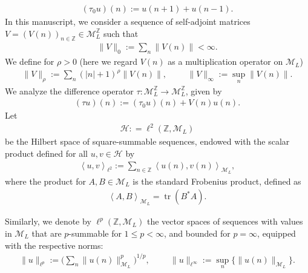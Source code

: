 \documentclass[12pt,oneside,onecolumn,open]{article}
\begin{document}
\begin{align}\label{Edso1}
(\tau_{0}u)(n ) := u(n+1) + u(n-1).      
\end{align}
In this manuscript, we consider a sequence of self-adjoint matrices $V=(V(n))_{n\in \mathbb{Z}}\in \mathcal{M}_{L}^{\mathbb{Z}} $ such that 
\begin{align} \label{firstfinitemoment}
  \|  V \|_{0}  :=      \sum_{n}   \| V(n) \| < \infty.    
\end{align}
We define for $ \rho > 0 $  (here we regard $V(n)$
 as a multiplication operator on $ \mathcal{M}_L$)
\begin{align} \label{normV1}
{  \|  V \|_{\rho}  :=       \sum_{n}(|n| + 1) }^{\rho}\| V(n) \|,   \hspace{1cm}       \|  V \|_{\infty}  :=\sup_{n}   \| V(n) \|  .  \end{align} 
We analyze the difference operator   $\tau: \mathcal{M}_L^{\mathbb{Z}} \to  \mathcal{M}_L^{\mathbb{Z}} $, given by 
\begin{align}\label{Edso1}
(\tau u)(n ) :=   (\tau_{0}u)(n ) + V(n) u(n).    
\end{align}
Let 
\begin{align}\label{ell2}
\mathcal{H} : = \ell^{2}(\mathbb{Z}, \mathcal{M}_{L})
\end{align}
be the Hilbert space of square-summable sequences, endowed with the scalar product defined for all \(u, v \in \mathcal{H}\) by
\begin{align}
    \left<u,v\right>_{\ell ^{2}}:=\sum _{n\in \mathbb{Z}}\left<u(n), v(n)\right>_{\mathcal{M}_L},
\end{align}
where the product for \(A, B \in \mathcal{M}_L\) is the standard Frobenius product, defined as
\begin{align}
    \left<A,B\right>_{\mathcal{M}_L}=\operatorname{tr} (B^{*}A). 
\end{align}

Similarly, we denote by $\ell^{p}(\mathbb{Z}, \mathcal{M}_{L})$ the vector spaces of sequences with values in $\mathcal{M}_{L}$ that are $p$-summable for $1 \le p < \infty$, and bounded for $p = \infty$, equipped with the respective norms:
\begin{align}\label{ellpspaces}
    \|u\|_{\ell ^{p}}:=  \Big ( \sum _n \|u(n)\|_{\mathcal{M}_L}^{p} \Big )^{1/p}, \hspace{1cm}
\|u\|_{\ell ^{\infty}}:=\sup _n \{\|u(n)\|_{\mathcal{M}_L}\}.
\end{align}
\color{black}
\end{document}
